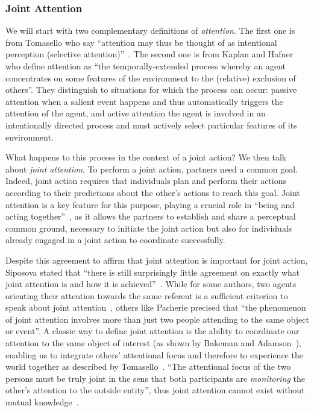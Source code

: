 \documentclass[a4paper,11pt,twoside]{StyleThese}
\begin{document}
\subsubsection{Joint Attention}\label{chap1:subsubsec:joint_att}
We will start with two complementary definitions of \emph{attention}. The first one is from Tomasello \etal{} who say ``attention may thus be thought of as intentional perception (selective attention)''~\cite{tomasello_2005_understanding}. The second one is from Kaplan and Hafner~\cite{kaplan_2006_challenges} who define attention as ``the temporally-extended process whereby an agent concentrates on some features of the environment to the (relative) exclusion of others''. They distinguish to situations for which the process can occur: passive attention when a salient event happens and thus automatically triggers the attention of the agent, and active attention the agent is involved in an
intentionally directed process and must actively select particular features of its environment. 

What happens to this process in the context of a joint action? We then talk about \emph{joint attention}. To perform a joint action, partners need a common goal. Indeed, joint action requires that individuals plan and perform their actions according to their predictions about the other’s actions to reach this goal. Joint attention is a key feature for this purpose, playing a crucial role in ``being and acting together''~\cite{tomasello_2009_cultural}, as it allows the partners to establish and share a perceptual common ground, necessary to initiate the joint action but also for individuals already engaged in a joint action to coordinate successfully. 

Despite this agreement to affirm that joint attention is important for joint action, Siposova stated that ``there is still surprisingly little agreement on exactly what joint attention is and how it is achieved''~\cite{siposova_2019_new}. While for some authors, two agents orienting their attention towards the same referent is a sufficient criterion to speak about joint attention~\cite{butterworth_1991_minds}, others like Pacherie precised that ``the phenomenon of joint attention involves more than just two people attending to the same object or event''. A classic way to define joint attention is the ability to coordinate our attention to the same object of interest (\eg as shown by Bakeman and Adamson~\cite{bakeman_1984_coordinating}), enabling us to integrate others’ attentional focus and therefore to experience the world together as described by Tomasello~\cite{tomasello_2009_cultural}.  ``The attentional focus of the two persons must be truly joint in the sens that both participants are \emph{monitoring} the other's attention to the outside entity'', thus joint attention cannot exist without mutual knowledge~\cite[p.~106]{tomasello_1995_joint}.
\end{document}
